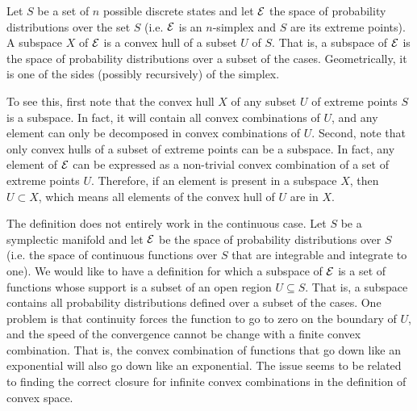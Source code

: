 \begin{example}
	Let $S$ be a set of $n$ possible discrete states and let $\mathcal{E}$ the space of probability distributions over the set $S$ (i.e. $\mathcal{E}$ is an $n$-simplex and $S$ are its extreme points). A subspace $X$ of $\mathcal{E}$ is a convex hull of a subset $U$ of $S$. That is, a subspace of $\mathcal{E}$ is the space of probability distributions over a subset of the cases. Geometrically, it is one of the sides (possibly recursively) of the simplex.
	
	To see this, first note that the convex hull $X$ of any subset $U$ of extreme points $S$ is a subspace. In fact, it will contain all convex combinations of $U$, and any element can only be decomposed in convex combinations of $U$. Second, note that only convex hulls of a subset of extreme points can be a subspace. In fact, any element of $\mathcal{E}$ can be expressed as a non-trivial convex combination of a set of extreme points $U$. Therefore, if an element is present in a subspace $X$, then $U \subset X$, which means all elements of the convex hull of $U$ are in $X$.
\end{example}

\begin{remark}
	The definition does not entirely work in the continuous case. Let $S$ be a symplectic manifold and let $\mathcal{E}$ be the space of probability distributions over $S$ (i.e. the space of continuous functions over $S$ that are integrable and integrate to one). We would like to have a definition for which a subspace of $\mathcal{E}$ is a set of functions whose support is a subset of an open region $U \subseteq S$. That is, a subspace contains all probability distributions defined over a subset of the cases. One problem is that continuity forces the function to go to zero on the boundary of $U$, and the speed of the convergence cannot be change with a finite convex combination. That is, the convex combination of functions that go down like an exponential will also go down like an exponential. The issue seems to be related to finding the correct closure for infinite convex combinations in the definition of convex space.
\end{remark}

